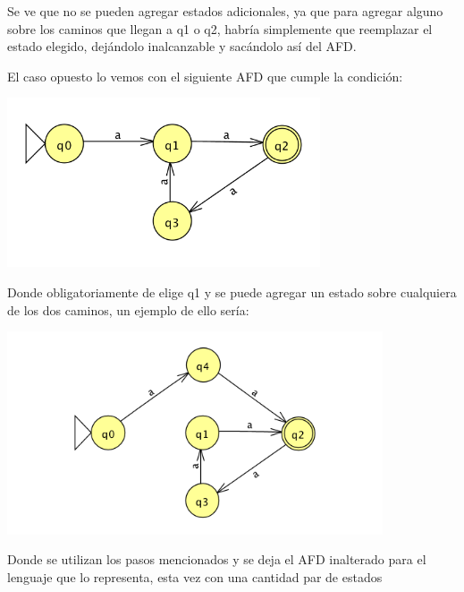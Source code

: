 \documentclass[11pt,letterpaper]{article}
\begin{document}
Se ve que no se pueden agregar estados adicionales, ya que para agregar alguno sobre los caminos que llegan a q1 o q2, habría simplemente que reemplazar el estado elegido, dejándolo inalcanzable y sacándolo así del AFD.

El caso opuesto lo vemos con el siguiente AFD que cumple la condición:
\begin{center}
\includegraphics[height=5cm]{tarea_5-c2.png}
\end{center}

Donde obligatoriamente de elige q1 y se puede agregar un estado sobre cualquiera de los dos caminos, un ejemplo de ello sería:
\begin{center}
\includegraphics[height=6cm]{tarea_5-c3.png}
\end{center}

Donde se utilizan los pasos mencionados y se deja
el AFD inalterado para el lenguaje que lo representa, esta vez con una cantidad par de estados
\end{document}
